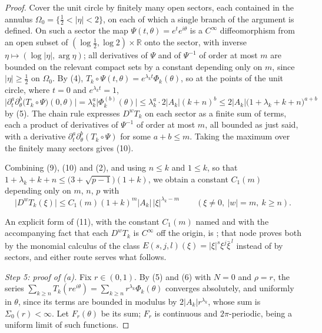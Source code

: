 \begin{proof}
Cover the unit circle by finitely many open sectors, each contained in the
annulus $\Omega_0=\{\tfrac12<|\eta|<2\}$, on each of which a single branch of
the argument is defined.  On such a sector the map
$\Psi(t,\theta)=e^{t}e^{i\theta}$ is a $C^\infty$ diffeomorphism from an open
subset of $(\log\tfrac12,\log2)\times\mathbb{R}$ onto the sector, with inverse
$\eta\mapsto(\log|\eta|,\arg\eta)$; all derivatives of $\Psi$ and of
$\Psi^{-1}$ of order at most $m$ are bounded on the relevant compact sets by a
constant depending only on $m$, since $|\eta|\ge\tfrac12$ on $\Omega_0$.  By
(4), $T_k\circ\Psi(t,\theta)=e^{\lambda_kt}\Phi_k(\theta)$, so at the points of
the unit circle, where $t=0$ and $e^{\lambda_kt}=1$,
\[
  \bigl|\partial_t^{a}\partial_\theta^{b}\bigl(T_k\circ\Psi\bigr)(0,\theta)\bigr|
  =\lambda_k^{a}\bigl|\Phi_k^{(b)}(\theta)\bigr|
  \le\lambda_k^{a}\cdot2|A_k|(k+n)^{b}
  \le2|A_k|\bigl(1+\lambda_k+k+n\bigr)^{a+b}
\]
by (5).  The chain rule expresses $D^{w}T_k$ on each sector as a finite sum of
terms, each a product of derivatives of $\Psi^{-1}$ of order at most $m$, all
bounded as just said, with a derivative
$\partial_t^{a}\partial_\theta^{b}(T_k\circ\Psi)$ for some $a+b\le m$.  Taking
the maximum over the finitely many sectors gives (10).

Combining (9), (10) and (2), and using $n\le k$ and $1\le k$, so that
$1+\lambda_k+k+n\le\bigl(3+\sqrt{p-1}\bigr)(1+k)$, we obtain a constant
$C_1(m)$ depending only on $m$, $n$, $p$ with
\begin{equation}\tag{11}
  \bigl|D^{w}T_k(\xi)\bigr|\le C_1(m)(1+k)^{m}|A_k|\,|\xi|^{\lambda_k-m}
  \qquad(\xi\neq0,\ |w|=m,\ k\ge n).
\end{equation}

An explicit form of (11), with the constant $C_1(m)$ named and with the
accompanying fact that each $D^{w}T_k$ is $C^\infty$ off the origin, is
; that node proves both by the monomial
calculus of the class $E(s,j,l)(\xi)=|\xi|^{s}\xi^{j}\bar\xi^{\,l}$ instead of
by sectors, and either route serves what follows.


\emph{Step 5: proof of (a).}  Fix $r\in(0,1)$.  By (5) and (6) with $N=0$ and
$\rho=r$, the series $\sum_{k\ge n}T_k(re^{i\theta})
=\sum_{k\ge n}r^{\lambda_k}\Phi_k(\theta)$ converges absolutely, and uniformly
in $\theta$, since its terms are bounded in modulus by $2|A_k|r^{\lambda_k}$,
whose sum is $\Sigma_0(r)<\infty$.  Let $F_r(\theta)$ be its sum; $F_r$ is
continuous and $2\pi$-periodic, being a uniform limit of such functions.


\end{proof}
